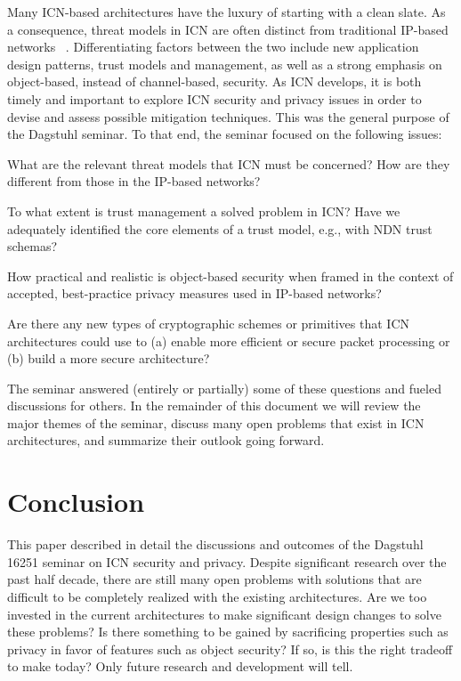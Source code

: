 \documentclass{sig-alternate-05-2015}
\makeatletter
\renewcommand{\paragraph}[1]{\vspace*{0.03in}\noindent{\bf #1.}\hspace{0.25ex \@plus1ex \@minus.2ex}}
\makeatother
\begin{document}
\paragraph{Current Research Challenges}
Many ICN-based architectures have the luxury of starting with a clean slate.
As a consequence, threat models in ICN are often distinct from traditional IP-based
networks ~\cite{wsv-bdpts-13,gtuz-ddndn-13}. Differentiating factors between the two include
new application design patterns, trust models and management, as well as a strong
emphasis on object-based, instead of channel-based, security. As ICN develops, it is both
timely and important to explore ICN security and privacy issues in order to devise and
assess possible mitigation techniques. This was the general purpose of the Dagstuhl
seminar. To that end, the seminar focused on the following issues:
%
\begin{compactitem}
\item What are the relevant threat models that ICN must be concerned? How are
they different from those in the IP-based networks?
\item To what extent is trust management a solved problem in ICN? Have we adequately
identified the core elements of a trust model, e.g., with NDN trust schemas?
\item How practical and realistic is object-based security when framed in the
context of accepted, best-practice privacy measures used in IP-based networks?
\item Are there any new types of cryptographic schemes or primitives that ICN architectures
could use to (a) enable more efficient or secure packet
processing or (b) build a more secure architecture?
\end{compactitem}
%
The seminar answered (entirely or partially) some of these questions and fueled discussions
for others. In the remainder of this document we will review the major themes of the
seminar, discuss many open problems that exist in ICN architectures, and summarize
their outlook going forward.




\section{Conclusion}
This paper described in detail the discussions and outcomes of the Dagstuhl 16251
seminar on ICN security and privacy. Despite significant research over the past
half decade, there are still many open problems with solutions that are difficult
to be completely realized with the existing architectures. Are we too invested in
the current architectures to make significant design changes to solve these problems?
Is there something to be gained by sacrificing properties such as privacy in favor
of features such as object security? If so, is this the right tradeoff to make today?
Only future research and development will tell.
\end{document}
